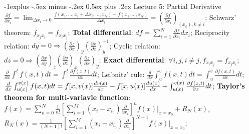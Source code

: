 \documentclass[10pt,landscape]{article}
\makeatletter
\renewcommand{\subsection}{\@startsection{subsection}{2}{0mm}%
                                {-1explus -.5ex minus -.2ex}%
                                {0.5ex plus .2ex}%
                                {\normalfont\normalsize\bfseries}}
\makeatother
\begin{document}
\begin{multicols}{3}
\subsection{Lecture 5: Partial Derivative}
$\frac{\partial f}{\partial x_i} = \lim_{\Delta x_i \to 0} 
	\frac{f(x_1, \ldots, x_i + \Delta x_i, \ldots, x_N) - 
	f(x_1, \ldots, x_N)}{\Delta x_i} = \left( \frac{\partial f}{\partial x_i}
	\right)_{(x_k), k \ne i}$;
Schwarz' theorem: $f_{x_jx_i} = f_{x_ix_j}$;
\textbf{Total differential}: $df = \sum_{i=1}^N \frac{\partial f}{\partial x_i} dx_i$;
Reciprocity relation: $dy = 0 \Rightarrow \left( \frac{\partial
	z}{\partial x} \right)_y \left( \frac{\partial x}{\partial z} \right)_y^{-1}$;
Cyclic relation: $dz = 0 \Rightarrow \left( \frac{\partial x}{\partial
	y} \right)_z \left( \frac{\partial y}{\partial z} \right)_x
	 \left( \frac{\partial z}{\partial x} \right)_y$;
\textbf{Exact differential}: $\forall i, j, i \ne j, f_{x_ix_j} = f_{x_jx_i}$;
$\frac{\partial}{\partial x} \int^t f(x,t) dt = \int^t \frac{\partial
	f(x,t)}{\partial x} dt$;
Leibnitz' rule: $\frac{d}{d x} \int_u^v f(x,t) dt = \int_u^v \frac{\partial
	f(x,t)}{\partial x} dt$;
$\frac{d}{d x} \int_{u(x)}^{v(x)} f(x,t) dt = 
	f[x,v(x)] \frac{dv(x)}{dx} - f[x,u(x)] \frac{du(x)}{dx} \\
	+ \int_{u(x)}^{v(x)} \frac{\partial f(x,t)}{\partial x} dt$;
\textbf{Taylor's theorem for multi-variavle function}: 
	$f(x) = \sum_{n=0}^N \frac{1}{n!} \left[ \sum_{i=1}^M (x_i - x_{i_0}) 
	\frac{\partial}{\partial x_i} \right]^n f(x) \biggl|_{x=x_0} + R_N(x)$,
$R_N(x) = \frac{1}{(N+1)!} \left[ \sum_{i=1}^M (x_i - x_{i_0}) 
\frac{\partial}{\partial x_i} \right]^{N+1} f(x) \biggl|_{x=x_0}$;


\end{multicols}
\end{document}
